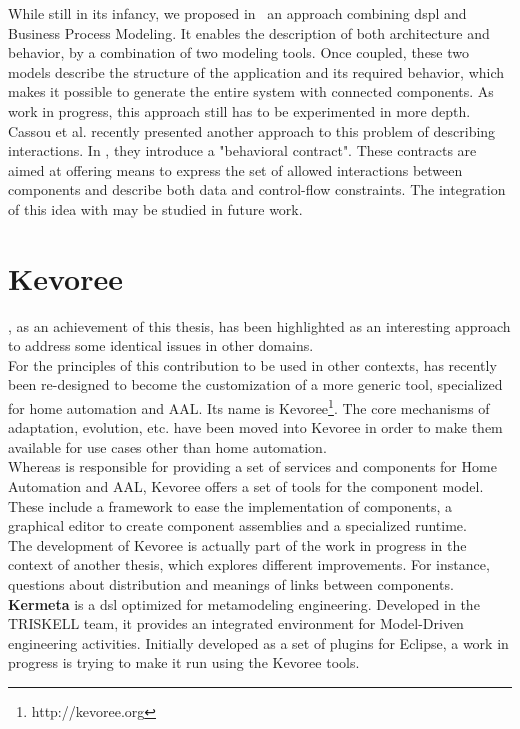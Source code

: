 While still in its infancy, we proposed in~\cite{Istoan09a} an approach combining \gls{dspl} and Business Process Modeling. It enables the description of both architecture and behavior, by a combination of two modeling tools. Once coupled, these two models describe the structure of the application and its required behavior, which makes it possible to generate the entire system with connected components. As work in progress, this approach still has to be experimented in more depth.\\
Cassou et al. recently presented another approach to this problem of describing interactions. In \cite{Cassou:2011}, they introduce a "behavioral contract". These contracts are aimed at offering means to express the set of allowed interactions between components and describe both data and control-flow constraints. The integration of this idea with \enti{} may be studied in future work.


\section{Kevoree}

\enti{}, as an achievement of this thesis, has been highlighted as an interesting approach to address some identical issues in other domains.\\

For the principles of this contribution to be used in other contexts, \enti{} has recently been re-designed to become the customization of a more generic tool, specialized for home automation and AAL. Its name is Kevoree\footnote{http://kevoree.org}. The core mechanisms of adaptation, evolution, etc. have been moved into Kevoree in order to make them available for use cases other than home automation.\\

Whereas \enti{} is responsible for providing a set of services and components for Home Automation and AAL, Kevoree offers a set of tools for the component model. These include a framework to ease the implementation of components, a graphical editor to create component assemblies and a specialized runtime.\\
The development of Kevoree is actually part of the work in progress in the context of another thesis, which explores different improvements. For instance, questions about distribution and meanings of links between components.\\

{\bf Kermeta} is a \gls{dsl} optimized for metamodeling engineering. Developed in the TRISKELL team, it provides an integrated environment for Model-Driven engineering activities. Initially developed as a set of plugins for Eclipse, a work in progress is trying to make it run using the Kevoree tools.\\

